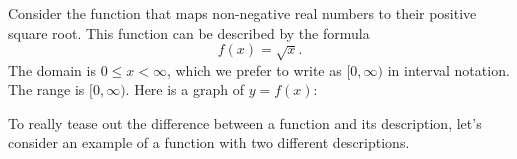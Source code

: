 \documentclass{ximera}
\begin{document}
\begin{example}
Consider the function that maps non-negative real numbers to their
positive square root. This function can be described by the
formula
\[
f(x) = \sqrt{x}.
\]
The domain is $0\le x<\infty$, which we prefer to write as
$[0,\infty)$ in interval notation. The range is $[0,\infty)$.  Here is
    a graph of $y=f(x)$:
\begin{image}
\end{image}
\end{example}

To really tease out the difference between a function and its
description, let's consider an example of a function with two
different descriptions.
\end{document}
